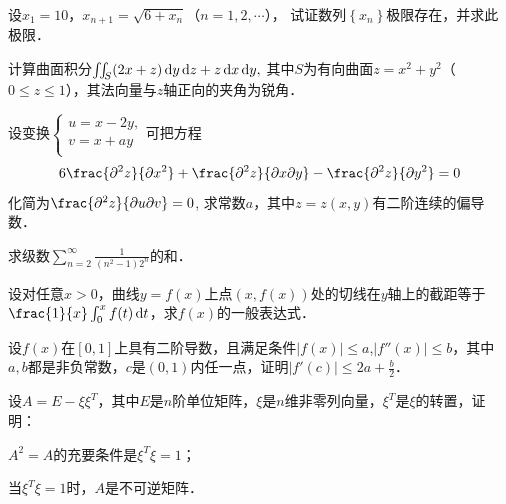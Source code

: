 \documentclass[plain,noanswer,medmath]{../../template/jnuexam}
\begin{document}
\begin{problem}
设$x_1 = 10$，$x_{n + 1} = \sqrt{6 + x_n}$（$n = 1,2, \cdots$），
试证数列$\left\{x_n \right\}$极限存在，并求此极限．
\end{problem}




\begin{problem}
计算曲面积分$\iint_S (2x + z)\mathop{}\!\mathrm{d} y\mathop{}\!\mathrm{d} z + z\mathop{}\!\mathrm{d} x\mathop{}\!\mathrm{d} y,$
其中$S$为有向曲面$z = x^2 + y^2$（$0 \le z \le 1$），其法向量与$z$轴正向的夹角为锐角．
\end{problem}


\begin{problem}
设变换$\begin{cases}
 u = x - 2y, \\
 v = x + ay \\
\end{cases}$可把方程
$$6\frac{\pd^2z}{\pd x^2} + \frac{\pd^2z}{\pdx\pd y} - \frac{\pd^2z}{\pd y^2} = 0$$
化简为$\frac{\pd^2 z}{\pdu\pd v} = 0$,
求常数$a$，其中$z = z(x,y)$有二阶连续的偏导数．
\end{problem}



\begin{problem}
求级数$\sum_{n = 2}^{\infty}\frac{1}{(n^2 - 1)2^n}$的和．
\end{problem}



\begin{problem}
设对任意$x > 0$，曲线$y = f(x)$上点$(x,f(x))$处的切线在$y$轴上的截距等于
$\frac{1}{x}\int_0^x f(t) \dt$，求$f(x)$的一般表达式．
\end{problem}



\begin{problem}
设$f(x)$在$[0,1]$上具有二阶导数，且满足条件$|f(x)| \le a$,$|f''(x)| \le b$，其中$a,b$都是非负常数，$c$是$(0,1)$内任一点，证明$|f'(c)| \le 2a + \frac{b}{2}$．
\end{problem}



\begin{problem}
设$A = E - \xi \xi^T$，其中$E$是$n$阶单位矩阵，$\xi$是$n$维非零列向量，$\xi^T$是$\xi$的转置，证明：\par
\begin{enumerate*}
\item $A^2 = A$的充要条件是$\xi^T\xi = 1$；
\item 当$\xi^T\xi = 1$时，$A$是不可逆矩阵．
\end{enumerate*}
\end{problem}
\end{document}
